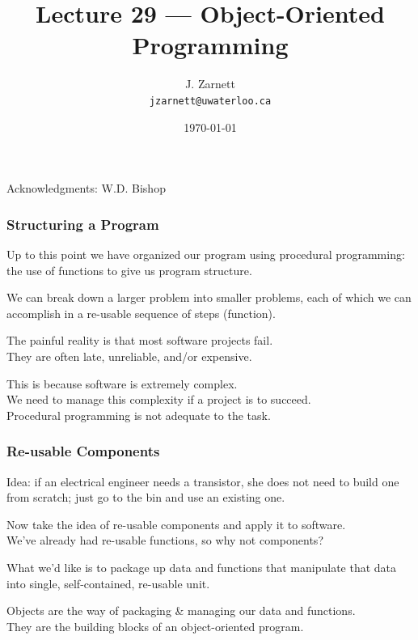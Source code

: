 

\title{Lecture 29 --- Object-Oriented Programming }

\author{J. Zarnett\\
\texttt{jzarnett@uwaterloo.ca}}
\date{\today}



\begin{frame}
  \titlepage
  
  \begin{center}
  \small{Acknowledgments: W.D. Bishop}
  \end{center}
\end{frame}



\begin{frame}
\frametitle{Structuring a Program}

Up to this point we have organized our program using procedural programming: the use of functions to give us program structure.

We can break down a larger problem into smaller problems, each of which we can accomplish in a re-usable sequence of steps (function).

The painful reality is that most software projects fail.\\
\quad They are often late, unreliable, and/or expensive.

This is because software is extremely complex.\\
\quad We need to manage this complexity if a project is to succeed.\\
\quad Procedural programming is not adequate to the task.

\end{frame}

\begin{frame}
\frametitle{Re-usable Components}

Idea: if an electrical engineer needs a transistor, she does not need to build one from scratch; just go to the bin and use an existing one.

Now take the idea of re-usable components and apply it to software.\\
\quad We've already had re-usable functions, so why not components?

What we'd like is to package up data and functions that manipulate that data into single, self-contained, re-usable unit.

\alert{Objects} are the way of packaging \& managing our data and functions.\\
\quad They are the building blocks of an object-oriented program.

\end{frame}

